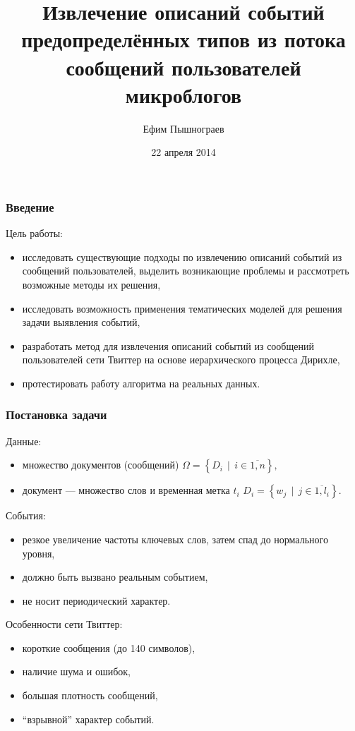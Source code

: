 \documentclass[10pt,pdf,hyperref={unicode}]{beamer}
\author{Ефим Пышнограев}
\date{22 апреля 2014}
\institute{Филиал МГУ в городе Севастополе}
\title{Извлечение описаний событий предопределённых типов из потока сообщений пользователей микроблогов}
\DeclareMathOperator{\svert}{\,\vert\,}
\begin{document}
\begin{frame}
  \titlepage
\end{frame}

\begin{frame}
  \frametitle{Введение}
  Цель работы:
  \begin{itemize}
	\item исследовать существующие подходы по извлечению описаний событий из сообщений пользователей, выделить возникающие проблемы и рассмотреть возможные методы их решения,
	\item исследовать возможность применения тематических моделей для решения задачи выявления событий,
	\item разработать метод для извлечения описаний событий из сообщений пользователей сети Твиттер на основе иерархического процесса Дирихле,
	\item протестировать работу алгоритма на реальных данных.
	\end{itemize}
\end{frame}

\begin{frame}
  \frametitle{Постановка задачи}
  Данные:
  \begin{itemize}
  	\item 
  	множество документов (сообщений) 
  	$\Omega = \left\{D_i \svert i \in \overline{1,n} \right\},$
	\item 
	документ --- множество слов и временная метка $t_i$ 
	$D_i = \left\{w_j \svert j \in \overline{ 1, l_i } \right\}.$
  \end{itemize}
  
  События:
  \begin{itemize}
	\item резкое увеличение частоты ключевых слов, затем спад до нормального уровня,
	\item должно быть вызвано реальным событием,
	\item не носит периодический характер.
  \end{itemize}
  
  Особенности сети Твиттер:
  \begin{itemize}
  \item короткие сообщения (до 140 символов),
  \item наличие шума и ошибок,
  \item большая плотность сообщений,
  \item ``взрывной'' характер событий.
  \end{itemize}
  
\end{frame}
\end{document}
